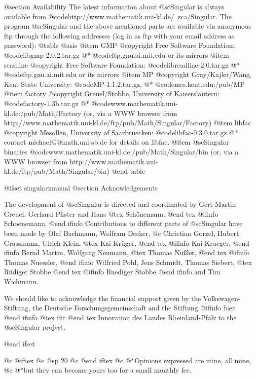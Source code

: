 @section Availability
The latest information about @sc{Singular} is always available from
@code{http://www.mathematik.uni-kl.de/~zca/Singular}.
The program @sc{Singular} and the above mentioned parts are available via
anonymous ftp through the following addresses
(log in as ftp with your email address as password):
@table @asis
@item GMP
@copyright{} Free Software Foundation:
@code{libgmp-2.0.2.tar.gz}
@* @code{ftp.gnu.ai.mit.edu} or its mirrors
@item readline
@copyright{} Free Software Foundation:
@code{libreadline-2.0.tar.gz}
@* @code{ftp.gnu.ai.mit.edu} or its mirrors
@item MP
@copyright{} Gray/Kajler/Wang, Kent State University:
@code{MP-1.1.2.tar.gz},
@* @code{mcs.kent.edu:/pub/MP}
@item factory
@copyright{} Greuel/Stobbe, University of Kaiserslautern:
@code{factory-1.3b.tar.gz}
@* @code{www.mathematik.uni-kl.de:/pub/Math/Factory}
(or, via a WWW browser from http://www.mathematik.uni-kl.de/ftp/pub/Math/Singular/Factory)
@item libfac
@copyright{}  Mesollen, University  of Saarbruecken:
@code{libfac-0.3.0.tar.gz}
@* contact michael@@math.uni-sb.de for details on libfac.
@item @sc{Singular} binaries
@code{www.mathematik.uni-kl.de:/pub/Math/Singular/bin}
(or, via a WWW browser from http://www.mathematik.uni-kl.de/ftp/pub/Math/Singular/bin)
@end table

@ifset singularmanual
@section Acknowledgements

The development of @sc{Singular} is directed and coordinated by
Gert-Martin Greuel, Gerhard Pfister and Hans
@tex
 Sch\"onemann.
@end tex
@ifinfo
 Schoenemann.
@end ifinfo
Contributions to different parts of @sc{Singular} have been made by
Olaf Bachmann,
Wolfram Decker,
@c Christian Gorzel,
Hubert Grassmann,
Ulrich Klein,
@tex
Kai Kr\"uger,
@end tex
@ifinfo
Kai Krueger,
@end ifinfo
Bernd Martin,
Wolfgang Neumann,
@tex
Thomas N\"u{\ss}ler,
@end tex
@ifinfo
Thomas Nuessler,
@end ifinfo
Wilfried Pohl,
Jens Schmidt,
Thomas Siebert,
@tex
R\"udiger Stobbe
@end tex
@ifinfo
Ruediger Stobbe
@end ifinfo
and
Tim Wichmann.

We should like to acknowledge the financial support given by
the Volkswagen-Stiftung,
the Deutsche Forschungsgemeinschaft
and the Stiftung
@ifinfo
fuer
@end ifinfo
@tex
f\"ur
@end tex
 Innovation des Landes Rheinland-Pfalz
to the
@sc{Singular} project.

@end ifset

@c @iftex
@c @sp 20
@c @end iftex
@c @*Opinions expressed are mine,  all mine,
@c @*but they can become yours too for a small monthly fee.
